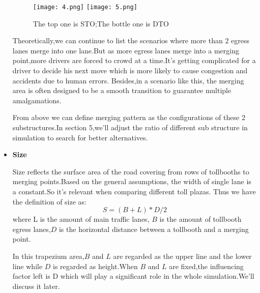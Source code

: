 \begin{itemize}
\begin{figure}
\centering
\texttt{[image: 4.png]}
\texttt{[image: 5.png]}
\caption{The top one is STO;The bottle one is DTO}
\label{2}
\end{figure}
Theoretically,we can continue to list the scenarios where more than 2 egress lanes merge into one lane.But as more egress lanes merge into a merging point,more drivers are forced to crowd at a time.It's getting complicated for a driver to decide his next move which is more likely to cause congestion and accidents due to human errors. Besides,in a scenario like this, the merging area is often designed to be a smooth transition to guarantee multiple amalgamations.

From above we can define merging pattern as the configurations of these 2 substructures.In section 5,we'll adjust the ratio of different sub structure in simulation to search for better alternatives.


\item{\textbf{Size}}

Size reflects the surface area of the road covering from rows of tollbooths to merging points.Based on the general assumptions, the width of single lane is a constant.So it's relevant when comparing different toll plazas. Thus we have the definition of size as:
$$S=(B+L)*D/2$$
where L is the amount of main traffic lanes, $B$ is the amount of tollbooth egress lanes,$D$ is the horizontal distance between a tollbooth and a merging point.

In this trapezium area,$B$ and $L$ are regarded as the upper line and the lower line while $D$ is regarded as height.When $B$ and $L$ are fixed,the influencing factor left is D which will play a significant role in the whole simulation.We'll discuss it later.
\end{itemize}

